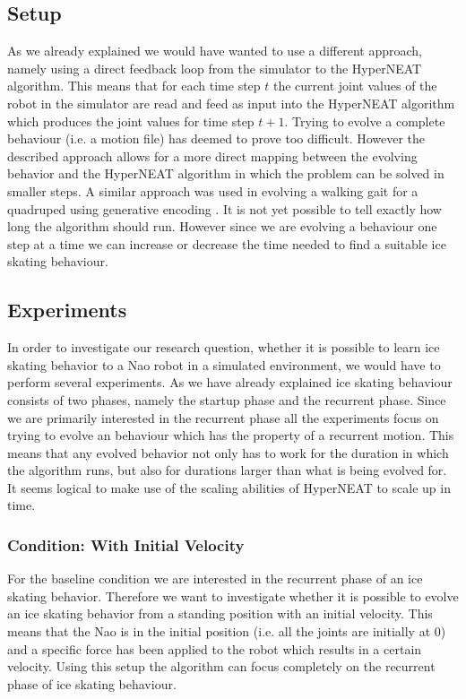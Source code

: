 \documentclass[a4paper,10pt]{article}
\begin{document}
\subsection{Setup}
\label{sec:setup}
As we already explained we would have wanted to use a different approach, namely using a direct feedback loop from the simulator to the HyperNEAT algorithm. This means that for each time step $t$ the current joint values of the robot in the simulator are read and feed as input into the HyperNEAT algorithm which produces the joint values for time step $t + 1$. Trying to evolve a complete behaviour (i.e. a motion file) has deemed to prove too difficult. However the described approach allows for a more direct mapping between the evolving behavior and the HyperNEAT algorithm in which the problem can be solved in smaller steps. A similar approach was used in evolving a walking gait for a quadruped using generative encoding \cite{EvolvingCoordinatedQuadrupedQaitsWithTheHyperNEATGenerativeEncoding}. It is not yet possible to tell exactly how long the algorithm should run. However since we are evolving a behaviour one step at a time we can increase or decrease the time needed to find a suitable ice skating behaviour.

\subsection{Experiments}
\label{sec:experiments}
In order to investigate our research question, whether it is possible to learn ice skating behavior to a Nao robot in a simulated environment, we would have to perform several experiments. As we have already explained ice skating behaviour consists of two phases, namely the startup phase and the recurrent phase. Since we are primarily interested in the recurrent phase all the experiments focus on trying to evolve an behaviour which has the property of a recurrent motion. This means that any evolved behavior not only has to work for the duration in which the algorithm runs, but also for durations larger than what is being evolved for. It seems logical to make use of the scaling abilities of HyperNEAT to scale up in time. 

\subsubsection{Condition: With Initial Velocity}
For the baseline condition we are interested in the recurrent phase of an ice skating behavior. Therefore we want to investigate whether it is possible to evolve an ice skating behavior from a standing position with an initial velocity. This means that the Nao is in the initial position (i.e. all the joints are initially at 0) and a specific force has been applied to the robot which results in a certain velocity. Using this setup the algorithm can focus completely on the recurrent phase of ice skating behaviour.
\end{document}
